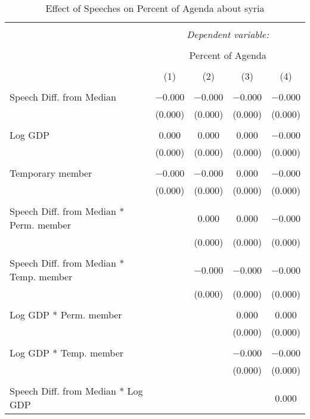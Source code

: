 
\begin{table}[!htbp] \centering 
  \caption{Effect of Speeches on Percent of Agenda about  syria} 
  \label{} 
\begin{tabular}{@{\extracolsep{5pt}}lcccc} 
\\[-1.8ex]\hline 
\hline \\[-1.8ex] 
 & \multicolumn{4}{c}{\textit{Dependent variable:}} \\ 
\cline{2-5} 
\\[-1.8ex] & \multicolumn{4}{c}{Percent of Agenda} \\ 
\\[-1.8ex] & (1) & (2) & (3) & (4)\\ 
\hline \\[-1.8ex] 
 Speech Diff. from Median & $-$0.000 & $-$0.000 & $-$0.000 & $-$0.000 \\ 
  & (0.000) & (0.000) & (0.000) & (0.000) \\ 
  & & & & \\ 
 Log GDP & 0.000 & 0.000 & 0.000 & $-$0.000 \\ 
  & (0.000) & (0.000) & (0.000) & (0.000) \\ 
  & & & & \\ 
 Temporary member & $-$0.000 & $-$0.000 & 0.000 & $-$0.000 \\ 
  & (0.000) & (0.000) & (0.000) & (0.000) \\ 
  & & & & \\ 
 Speech Diff. from Median * Perm. member &  & 0.000 & 0.000 & $-$0.000 \\ 
  &  & (0.000) & (0.000) & (0.000) \\ 
  & & & & \\ 
 Speech Diff. from Median * Temp. member &  & $-$0.000 & $-$0.000 & $-$0.000 \\ 
  &  & (0.000) & (0.000) & (0.000) \\ 
  & & & & \\ 
 Log GDP * Perm. member &  &  & 0.000 & 0.000 \\ 
  &  &  & (0.000) & (0.000) \\ 
  & & & & \\ 
 Log GDP * Temp. member &  &  & $-$0.000 & $-$0.000 \\ 
  &  &  & (0.000) & (0.000) \\ 
  & & & & \\ 
 Speech Diff. from Median * Log GDP &  &  &  & 0.000 \\ 

\end{tabular}
\end{table}
